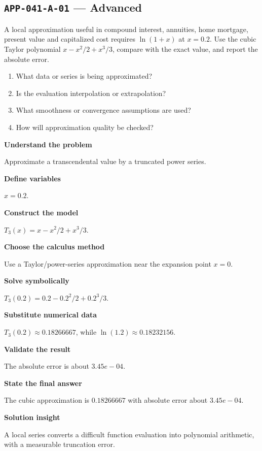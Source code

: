 \documentclass[11pt]{book}
\newcommand{\pid}[1]{\texttt{#1}}
\begin{document}
\subsection*{\pid{APP-041-A-01} — Advanced}
\begin{problembox}
A local approximation useful in compound interest, annuities, home mortgage, present value and capitalized cost requires $\ln(1+x)$ at $x=0.2$. Use the cubic Taylor polynomial $x-x^2/2+x^3/3$, compare with the exact value, and report the absolute error.
\end{problembox}
\begin{promptbox}\begin{enumerate}
\item What data or series is being approximated?
\item Is the evaluation interpolation or extrapolation?
\item What smoothness or convergence assumptions are used?
\item How will approximation quality be checked?
\end{enumerate}\end{promptbox}
\begin{solutionbox}
\textbf{Understand the problem}\par Approximate a transcendental value by a truncated power series.\par\medskip
\textbf{Define variables}\par $x=0.2$.\par\medskip
\textbf{Construct the model}\par $T_3(x)=x-x^2/2+x^3/3$.\par\medskip
\textbf{Choose the calculus method}\par Use a Taylor/power-series approximation near the expansion point $x=0$.\par\medskip
\textbf{Solve symbolically}\par $T_3(0.2)=0.2-0.2^2/2+0.2^3/3$.\par\medskip
\textbf{Substitute numerical data}\par $T_3(0.2)\approx 0.18266667$, while $\ln(1.2)\approx 0.18232156$.\par\medskip
\textbf{Validate the result}\par The absolute error is about $3.45e-04$.\par\medskip
\textbf{State the final answer}\par The cubic approximation is $0.18266667$ with absolute error about $3.45e-04$.\par\medskip
\textbf{Solution insight}\par A local series converts a difficult function evaluation into polynomial arithmetic, with a measurable truncation error.\par\medskip
\end{solutionbox}
\end{document}
